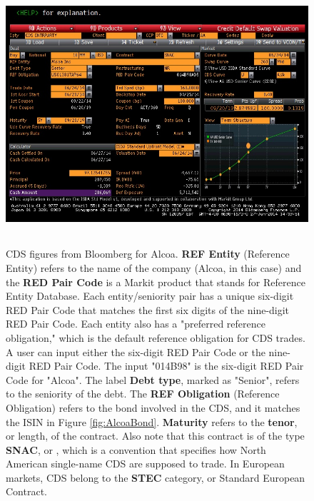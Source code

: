 \documentclass[article]{jss}
\begin{document}
\begin{figure}[H]
\centering
\includegraphics[width=5in, height=3.8in]{images/AlcoaIncCDS.jpg}
\caption{CDS figures from Bloomberg for Alcoa. \textbf{REF Entity} (Reference Entity) refers to the name of the company (Alcoa, in this case) and the \textbf{RED Pair Code} is a Markit product that stands for Reference Entity Database. Each entity/seniority pair has a unique six-digit RED Pair Code that matches the first six digits of the nine-digit RED Pair Code. Each entity also has a "preferred reference obligation," which is the default reference obligation for CDS  trades. A user can input either the six-digit RED Pair Code or the nine-digit RED Pair Code. The input "014B98" is the six-digit RED Pair Code for "Alcoa". The label \textbf{Debt type}, marked as "Senior", refers to the seniority of the debt. The \textbf{REF Obligation} (Reference Obligation) refers to the bond involved in the CDS, and it matches the ISIN in Figure \ref{fig:AlcoaBond}. \textbf{Maturity} refers to the \textbf{tenor}, or length, of the contract. Also note that this contract is of the type \textbf{SNAC}, or , which is a convention that specifies how North American single-name CDS are supposed to trade. In European markets, CDS belong to the \textbf{STEC} category, or Standard European Contract.}
\label{AlcoaIncCDS}
\end{figure}
\end{document}
